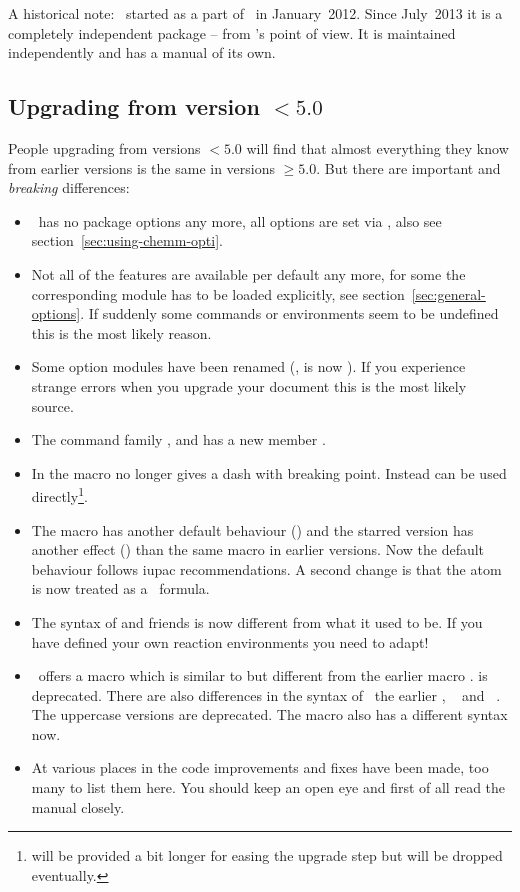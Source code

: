 \documentclass[load-preamble+]{cnltx-doc}
\begin{document}
A historical note: \chemformula\ started as a part of \chemmacros\ in
January~2012.  Since July~2013 it is a completely independent package -- from
\chemformula's point of view.  It is maintained independently and has a manual
of its own.

\subsection{Upgrading from version $<5.0$}
People upgrading from versions $<5.0$ will find that almost everything they
know from earlier versions is the same in versions $\geq5.0$.  But there are
important and \emph{breaking} differences:
\begin{itemize}
  \item \chemmacros\ has no package options any more, all options are set via
    , also see section~\vref{sec:using-chemm-opti}.
  \item Not all of the features are available per default any more, for some
    the corresponding module has to be loaded explicitly, see
    section~\ref{sec:general-options}.  If suddenly some commands or
    environments seem to be undefined this is the most likely reason.
  \item Some option modules have been renamed (\eg,  is now
    ).  If you experience strange errors when you upgrade
    your document this is the most likely source.
  \item The command family ,  and
     has a new member .
  \item In  the macro \cs*{-} no longer gives a dash with breaking
    point.  Instead \sym*{-} can be used directly\footnote{\cs*{-} will be
      provided a bit longer for easing the upgrade step but will be dropped
      eventually.}.
  \item The macro  has another default behaviour ()
    and the starred version has another effect () than the
    same macro in earlier versions.  Now the default behaviour follows
    \acs{iupac} recommendations.  A second change is that the atom is now
    treated as a \chemformula\ formula.
  \item The syntax of  and friends is now different from
    what it used to be.  If you have defined your own reaction environments
    you need to adapt!
  \item \chemmacros\ offers a macro  which is similar to but
    different from the earlier macro .   is deprecated.
    There are also differences in the syntax of  \vs\ the earlier
    ,  \vs\  and  \vs\
    .  The uppercase versions are deprecated. The  macro
    \cs{NewChemState} also has a different syntax now.
  \item At various places in the code improvements and fixes have been made,
    too many to list them here.  You should keep an open eye and first of all
    read the manual closely.
\end{itemize}
\end{document}

